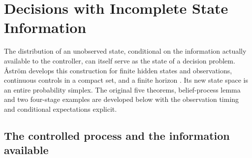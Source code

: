 \chapter{Decisions with Incomplete State Information}
\label{sec:p17-partial-observation-decisions}

The distribution of an unobserved state, conditional on the information
actually available to the controller, can itself serve as the state
of a decision problem. \AA str\"om develops this construction for
finite hidden states and observations, continuous controls in a compact
set, and a finite horizon \cite[pp.~174--205]{Astrom1965IncompleteInformation}.
Its new state space is an entire probability simplex.
The original five theorems, belief-process lemma and two four-stage
examples are developed below with the observation timing and conditional
expectations explicit.

\section{The controlled process and the information available}

